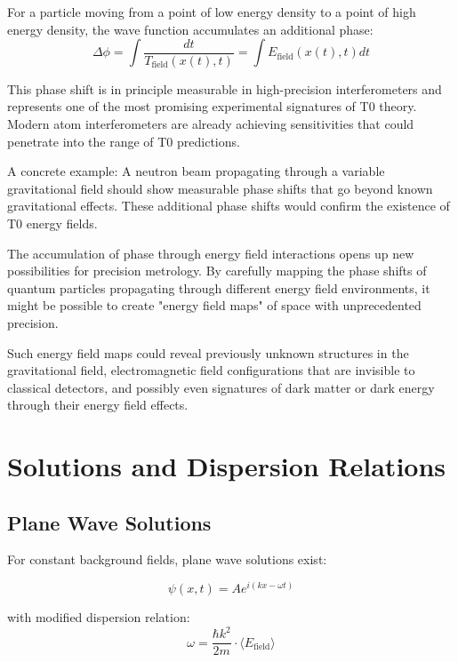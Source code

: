 \documentclass[12pt,a4paper]{article}
\theoremstyle{definition}
\theoremstyle{remark}
\begin{document}
For a particle moving from a point of low energy density to a point of high energy density, the wave function accumulates an additional phase:
$$\Delta \phi = \int \frac{dt}{T_{\text{field}}(x(t), t)} = \int E_{\text{field}}(x(t), t) dt$$

This phase shift is in principle measurable in high-precision interferometers and represents one of the most promising experimental signatures of T0 theory. Modern atom interferometers are already achieving sensitivities that could penetrate into the range of T0 predictions.

A concrete example: A neutron beam propagating through a variable gravitational field should show measurable phase shifts that go beyond known gravitational effects. These additional phase shifts would confirm the existence of T0 energy fields.

The accumulation of phase through energy field interactions opens up new possibilities for precision metrology. By carefully mapping the phase shifts of quantum particles propagating through different energy field environments, it might be possible to create "energy field maps" of space with unprecedented precision.

Such energy field maps could reveal previously unknown structures in the gravitational field, electromagnetic field configurations that are invisible to classical detectors, and possibly even signatures of dark matter or dark energy through their energy field effects.

\section{Solutions and Dispersion Relations}

\subsection{Plane Wave Solutions}

For constant background fields, plane wave solutions exist:

\begin{equation}
	\psi(x,t) = A e^{i(kx - \omega t)}
	\label{eq:plane_wave}
\end{equation}

with modified dispersion relation:
\begin{equation}
	\boxed{\omega = \frac{\hbar k^2}{2m} \cdot \langle E_{\text{field}} \rangle}
	\label{eq:modified_dispersion}
\end{equation}
\end{document}
